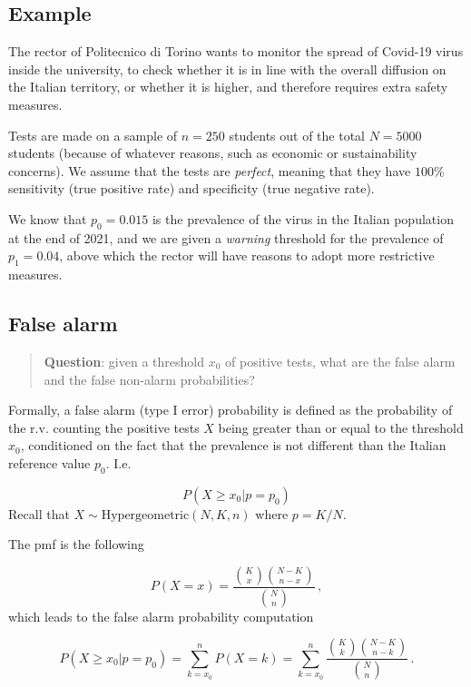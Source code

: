 \documentclass[
  oneside]{book}
\begin{document}
\hypertarget{example}{%
\subsection{Example}\label{example}}

The rector of Politecnico di Torino wants to monitor the spread of Covid-19
virus inside the university, to check whether it is in line with the overall
diffusion on the Italian territory, or whether it is higher,
and therefore requires extra safety measures.

Tests are made on a sample of \(n = 250\) students out of the total \(N = 5000\)
students (because of whatever reasons, such as economic or sustainability
concerns). We assume that the tests are \emph{perfect}, meaning that they have
\(100\%\) sensitivity (true positive rate) and specificity (true negative rate).

We know that \(p_0 = 0.015\) is the prevalence of the virus in the Italian
population at the end of 2021, and we are given a \emph{warning} threshold for the
prevalence of \(p_1 = 0.04\), above which the rector will have reasons to adopt
more restrictive measures.

\hypertarget{false-alarm}{%
\subsection{False alarm}\label{false-alarm}}

\begin{quote}
\textbf{Question}: given a threshold \(x_0\) of positive tests, what are the false
alarm and the false non-alarm probabilities?
\end{quote}

Formally, a false alarm (type I error) probability is defined as
the probability of the r.v. counting the positive tests \(X\) being greater than
or equal to the threshold \(x_0\), conditioned on the fact that the prevalence
is not different than the Italian reference value \(p_0\). I.e.

\[
P(X \geq x_0 | p = p_0)
\]
Recall that \(X \sim \text{Hypergeometric}(N, K, n)\) where \(p = K/N\).

The pmf is the following

\[
P(X = x) = \frac{\binom{K}{x}\binom{N - K}{n - x}}{\binom{N}{n}}\,,
\]
which leads to the false alarm probability computation

\[
P(X \geq x_0 | p = p_0) = \sum_{k = x_0}^{n}P(X = k) = \sum_{k = x_0}^{n}\frac{\binom{K}{k}
\binom{N - K}{n - k}}{\binom{N}{n}}\,.
\]
\end{document}

